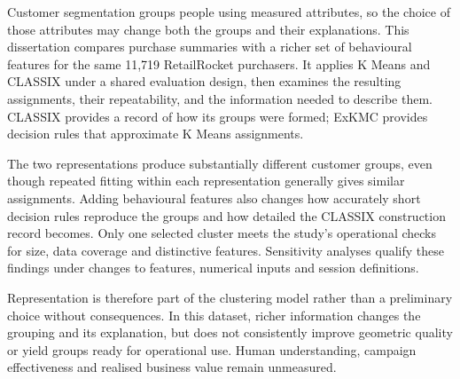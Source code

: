 Customer segmentation groups people using measured attributes, so the choice of those attributes may change both the groups and their explanations. This dissertation compares purchase summaries with a richer set of behavioural features for the same 11,719 RetailRocket purchasers. It applies K Means and CLASSIX under a shared evaluation design, then examines the resulting assignments, their repeatability, and the information needed to describe them. CLASSIX provides a record of how its groups were formed; ExKMC provides decision rules that approximate K Means assignments.

The two representations produce substantially different customer groups, even though repeated fitting within each representation generally gives similar assignments. Adding behavioural features also changes how accurately short decision rules reproduce the groups and how detailed the CLASSIX construction record becomes. Only one selected cluster meets the study's operational checks for size, data coverage and distinctive features. Sensitivity analyses qualify these findings under changes to features, numerical inputs and session definitions.

Representation is therefore part of the clustering model rather than a preliminary choice without consequences. In this dataset, richer information changes the grouping and its explanation, but does not consistently improve geometric quality or yield groups ready for operational use. Human understanding, campaign effectiveness and realised business value remain unmeasured.
